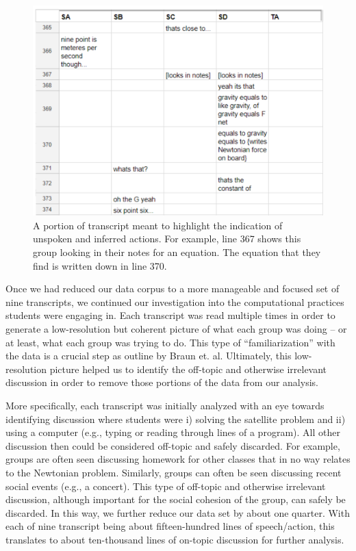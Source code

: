 \documentclass{msuphddissertation}
\begin{document}
\begin{doublespace}
\begin{figure}\centering
\includegraphics[scale=0.75]{./images/CH5Transcript.pdf}
\caption{A portion of transcript meant to highlight the indication of unspoken and inferred actions.  For example, line 367 shows this group looking in their notes for an equation.  The equation that they find is written down in line 370.}\label{CH5:Transcript}
\end{figure}

Once we had reduced our data corpus to a more manageable and focused set of nine transcripts, we continued our investigation into the computational practices students were engaging in.  Each transcript was read multiple times in order to generate a low-resolution but coherent picture of what each group was doing -- or at least, what each group was trying to do.  This type of ``familiarization'' with the data is a crucial step as outline by Braun et. al.  Ultimately, this low-resolution picture helped us to identify the off-topic and otherwise irrelevant discussion in order to remove those portions of the data from our analysis.

More specifically, each transcript was initially analyzed with an eye towards identifying discussion where students were i) solving the satellite problem and ii) using a computer (e.g., typing or reading through lines of a program).  All other discussion then could be considered off-topic and safely discarded.  For example, groups are often seen discussing homework for other classes that in no way relates to the Newtonian problem.  Similarly, groups can often be seen discussing recent social events (e.g., a concert).  This type of off-topic and otherwise irrelevant discussion, although important for the social cohesion of the group, can safely be discarded.  In this way, we further reduce our data set by about one quarter.  With each of nine transcript being about fifteen-hundred lines of speech/action, this translates to about ten-thousand lines of on-topic discussion for further analysis.


\end{doublespace}
\end{document}

